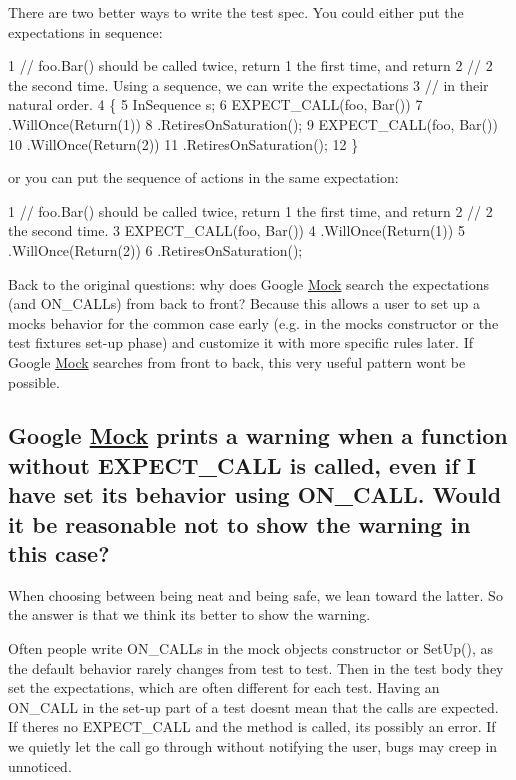 There are two better ways to write the test spec. You could either put the expectations in sequence\+:


\begin{DoxyCode}
1 // foo.Bar() should be called twice, return 1 the first time, and return
2 // 2 the second time.  Using a sequence, we can write the expectations
3 // in their natural order.
4 \{
5   InSequence s;
6   EXPECT\_CALL(foo, Bar())
7       .WillOnce(Return(1))
8       .RetiresOnSaturation();
9   EXPECT\_CALL(foo, Bar())
10       .WillOnce(Return(2))
11       .RetiresOnSaturation();
12 \}
\end{DoxyCode}


or you can put the sequence of actions in the same expectation\+:


\begin{DoxyCode}
1 // foo.Bar() should be called twice, return 1 the first time, and return
2 // 2 the second time.
3 EXPECT\_CALL(foo, Bar())
4     .WillOnce(Return(1))
5     .WillOnce(Return(2))
6     .RetiresOnSaturation();
\end{DoxyCode}


Back to the original questions\+: why does Google \hyperlink{class_mock}{Mock} search the expectations (and {\ttfamily O\+N\+\_\+\+C\+A\+LL}s) from back to front? Because this allows a user to set up a mock\textquotesingle{}s behavior for the common case early (e.\+g. in the mock\textquotesingle{}s constructor or the test fixture\textquotesingle{}s set-\/up phase) and customize it with more specific rules later. If Google \hyperlink{class_mock}{Mock} searches from front to back, this very useful pattern won\textquotesingle{}t be possible.

\subsection*{Google \hyperlink{class_mock}{Mock} prints a warning when a function without E\+X\+P\+E\+C\+T\+\_\+\+C\+A\+LL is called, even if I have set its behavior using O\+N\+\_\+\+C\+A\+LL. Would it be reasonable not to show the warning in this case?}

When choosing between being neat and being safe, we lean toward the latter. So the answer is that we think it\textquotesingle{}s better to show the warning.

Often people write {\ttfamily O\+N\+\_\+\+C\+A\+LL}s in the mock object\textquotesingle{}s constructor or {\ttfamily Set\+Up()}, as the default behavior rarely changes from test to test. Then in the test body they set the expectations, which are often different for each test. Having an {\ttfamily O\+N\+\_\+\+C\+A\+LL} in the set-\/up part of a test doesn\textquotesingle{}t mean that the calls are expected. If there\textquotesingle{}s no {\ttfamily E\+X\+P\+E\+C\+T\+\_\+\+C\+A\+LL} and the method is called, it\textquotesingle{}s possibly an error. If we quietly let the call go through without notifying the user, bugs may creep in unnoticed.

